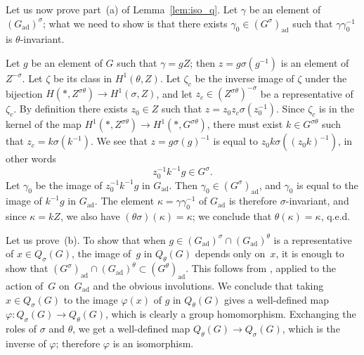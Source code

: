 \documentclass[10pt,leqno]{article}
\newcommand{\ad}{\mathrm{ad}}
\newcommand{\Gad}{G_\mathrm{ad}}
\begin{document}
Let us now prove part~(a) of Lemma~\ref{lem:iso_q}. Let $\gamma$ be an element of $(\Gad)^\sigma$; what we need to show is that there exists $\gamma_0 \in (G^\sigma)_{\ad}$ such that $\gamma \gamma_0^{-1}$ is $\theta$-invariant. 

Let $g$ be an element of $G$ such that $\gamma = gZ$; then $z=g \sigma(g^{-1})$ is an element of $Z^{-\sigma}$. Let $\zeta$ be its class in $H^{1}(\theta, Z)$. Let $\zeta_c$ be the inverse image of $\zeta$ under the bijection $H(\ast, Z^{\sigma\theta})\to H^{1}(\sigma, Z) $, and let $z_c\in (Z^{\sigma\theta})^{-\sigma}$ be a representative of $\zeta_c$. By definition there exists $z_0 \in Z$ such that $z = z_0 z_c \sigma(z_0^{-1})$. Since $\zeta_c$ is in the kernel of the map $H^1(\ast, Z^{\sigma\theta}) \to H^1(\ast, G^{\sigma\theta})$, there must exist  $k \in G^{\sigma\theta}$  such that $z_c = k \sigma(k^{-1})$. We see that $z = g \sigma(g)^{-1}$ is equal to $z_0 k \sigma((z_0k)^{-1})$, in other words 
\[ z_0^{-1} k^{-1} g \in G^{\sigma}.\]
Let $\gamma_0$ be the image of $z_0^{-1} k^{-1} g$ in $\Gad$. Then $\gamma_0 \in (G^{\sigma})_\ad$, and $\gamma_0$ is equal to the image of $k^{-1} g$ in $\Gad$. The element $\kappa=\gamma \gamma_0^{-1}$ of $\Gad$  is therefore $\sigma$-invariant, and since $\kappa=kZ$, we also have $(\theta\sigma)(\kappa)=\kappa$; we conclude that $\theta(\kappa) = \kappa$, q.e.d. 

Let us prove~(b). To show that when $g\in (\Gad)^\sigma \cap (\Gad)^\theta$ is a representative of $x \in Q_{\sigma}(G)$,  the image of~$g$ in  $Q_\theta(G)$ depends only on~$x$, it is enough to show that  $(G^\sigma)_\ad \cap (\Gad)^\theta \subset (G^\theta)_{\ad}$. This follows from \cite[Proposition 5.4]{galois}, applied to the action of~$G$ on~$\Gad$ and the obvious involutions. We conclude that taking $x \in Q_{\sigma}(G)$ to the image $\varphi(x)$ of $g$ in $Q_{\theta}(G)$ gives a well-defined map $\varphi\colon Q_{\sigma}(G)\to Q_{\theta}(G)$, which is clearly a group homomorphism. Exchanging the roles of $\sigma$ and $\theta$, we get a well-defined map $Q_{\theta}(G) \to Q_{\sigma}(G)$, which is the inverse of $\varphi$; therefore $\varphi$ is an isomorphism.

%
\end{document}

